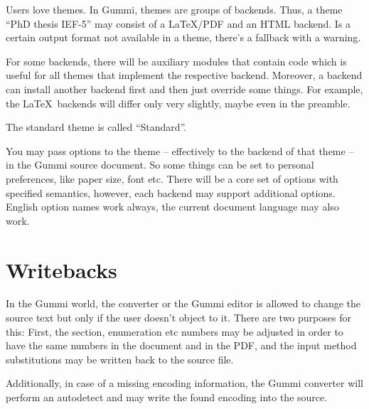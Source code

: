\documentclass[12pt,openany]{book}
\begin{document}
Users love themes.  In Gummi, themes are groups of backends.  Thus, a theme
``PhD thesis IEF-5'' may consist of a \LaTeX/PDF and an HTML backend.  Is a
certain output format not available in a theme, there's a fallback with a
warning.

For some backends, there will be auxiliary modules that contain code which
is useful for all themes that implement the respective backend.  Moreover, a
backend can install another backend first and then just override some things.
For example, the \LaTeX\ backends will differ only very slightly, maybe even in
the preamble.

The standard theme is called ``Standard''.

You may pass options to the theme -- effectively to the backend of that theme
-- in the Gummi source document.  So some things can be set to personal
preferences, like paper size, font etc.  There will be a core set of options
with specified semantics, however, each backend may support additional
options.  English option names work always, the current document language may
also work.


\section{Writebacks}

In the Gummi world, the converter or the Gummi editor is allowed to change the
source text but only if the user doesn't object to it.  There are two purposes
for this: First, the section, enumeration etc numbers may be adjusted in order
to have the same numbers in the document and in the PDF, and the input method
substitutions may be written back to the source file.

Additionally, in case of a missing encoding information, the Gummi converter
will perform an autodetect and may write the found encoding into the source.
\end{document}
